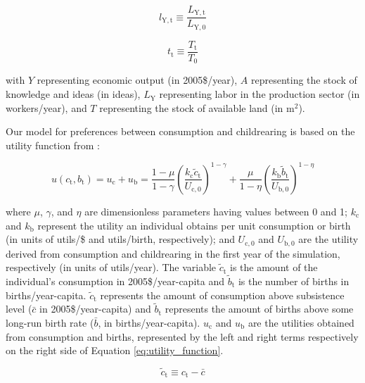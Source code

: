 \documentclass[letterpaper,12pt]{article}
\begin{document}
\begin{equation} \label{eq:index_l}
	l_\mathrm{Y,t} \equiv \frac{L_\mathrm{Y,t}}{L_\mathrm{Y,0}}
\end{equation}

\begin{equation} \label{eq:index_t}
	t_\mathrm{t} \equiv \frac{T_\mathrm{t}}{T_\mathrm{0}}
\end{equation}

\noindent with $Y$ representing economic output (in 2005\$/year), $A$ representing the stock of knowledge and ideas (in ideas), $L_\mathrm{Y}$ representing labor in the production sector (in workers/year), and $T$ representing the stock of available land (in m$^2$).

Our model for preferences between consumption and childrearing is based on the utility function from \citet{Jones:2001wn}:

\begin{equation} \label{eq:utility_function}
	u(c_\mathrm{t}, b_\mathrm{t}) = u_\mathrm{c} + u_\mathrm{b} = \frac{1-\mu}{1-\gamma} \left(\frac{k_\mathrm{c} \tilde c_\mathrm{t}}{U_\mathrm{c,0}} \right)^{1-\gamma} + \frac{\mu}{1-\eta} \left(\frac{k_\mathrm{b} \tilde b_\mathrm{t}}{U_\mathrm{b,0}} \right)^{1-\eta}
\end{equation}

\noindent where $\mu$, $\gamma$, and $\eta$ are dimensionless parameters having values between 0 and 1; $k_\mathrm{c}$ and $k_\mathrm{b}$ represent the utility an individual obtains per unit consumption or birth (in units of utils/\$ and utils/birth, respectively); and $U_{\mathrm{c,0}}$ and $U_{\mathrm{b,0}}$ are the utility derived from consumption and childrearing in the first year of the simulation, respectively (in units of utils/year). The variable $\tilde c_\mathrm{t}$ is the amount of the individual's consumption in 2005\$/year-capita and $\tilde b_\mathrm{t}$ is the number of births in births/year-capita. $\tilde c_\mathrm{t}$ represents the amount of consumption above subsistence level ($\bar c$ in 2005\$/year-capita) and $\tilde b_\mathrm{t}$ represents the amount of births above some long-run birth rate ($\bar b$, in births/year-capita). $u_\mathrm{c}$ and $u_\mathrm{b}$ are the utilities obtained from consumption and births, represented by the left and right terms respectively on the right side of Equation \ref{eq:utility_function}.

\begin{equation} \label{eq:c_tilde}
	\tilde c_\mathrm{t} \equiv c_\mathrm{t} - \bar c
\end{equation}
\end{document}
